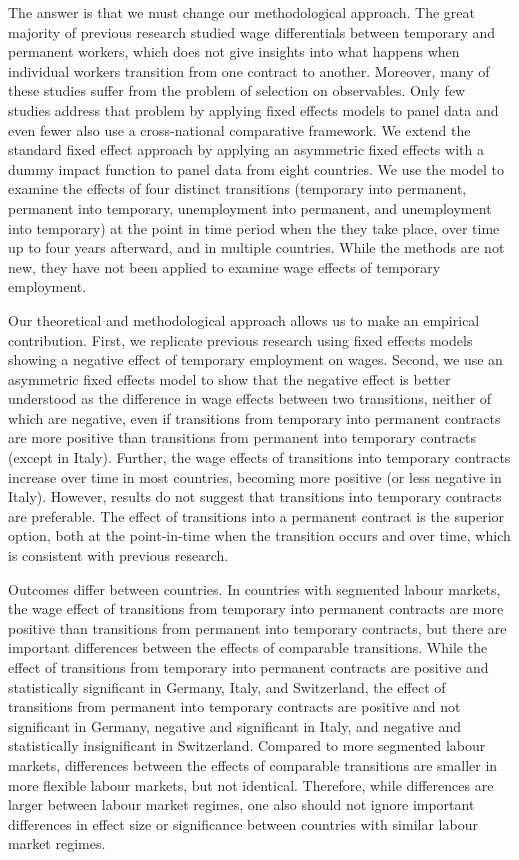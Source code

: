 \documentclass[12pt]{article}
\begin{document}
The answer is that we must change our methodological approach.  The great majority of previous research studied wage differentials between temporary and permanent workers, which does not give insights into what happens when individual workers transition from one contract to another. Moreover, many of these studies suffer from the problem of selection on observables. Only few studies address that problem by applying fixed effects models to panel data and even fewer also use a cross-national comparative framework.  We extend the standard fixed effect approach by applying an asymmetric fixed effects with a dummy impact function to panel data from eight countries.  We use the model to examine the effects of four distinct transitions (temporary into permanent, permanent into temporary, unemployment into permanent, and unemployment into temporary) at the point in time period when the they take place, over time up to four years afterward, and in multiple countries.  While the methods are not new, they have not been applied to examine wage effects of temporary employment.

Our theoretical and methodological approach allows us to make an empirical contribution.  First, we replicate previous research using fixed effects models showing a negative effect of temporary employment on wages.  Second, we use an asymmetric fixed effects model to show that the negative effect is better understood as the difference in wage effects between two transitions, neither of which are negative, even if transitions from temporary into permanent contracts are more positive than transitions from permanent into temporary contracts (except in Italy).  Further, the wage effects of transitions into temporary contracts increase over time in most countries, becoming more positive (or less negative in Italy).  However, results do not suggest that transitions into temporary contracts are preferable.  The effect of transitions into a permanent contract is the superior option, both at the point-in-time when the transition occurs and over time, which is consistent with previous research.  

Outcomes differ between countries.  In countries with segmented labour markets, the wage effect of transitions from temporary into permanent contracts are more positive than transitions from permanent into temporary contracts, but there are important differences between the effects of comparable transitions.  While the effect of transitions from temporary into permanent contracts are positive and statistically significant in Germany, Italy, and Switzerland, the effect of transitions from permanent into temporary contracts are positive and not significant in Germany, negative and significant in Italy, and negative and statistically insignificant in Switzerland.  Compared to more segmented labour markets, differences between the effects of comparable transitions are smaller in more flexible labour markets, but not identical.  Therefore, while differences are larger between labour market regimes, one also should not ignore important differences in effect size or significance between countries with similar labour market regimes.  
\end{document}
